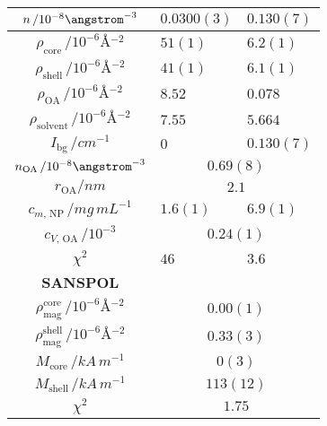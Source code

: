 \documentclass[\main/dresen_thesis.tex]{subfiles}
\begin{document}
\begin{table}[!htbp]
\begin{tabular}{ c | l | l }
        \hline
        \rule{0pt}{2ex} $n \, / 10^{-8} \angstrom^{-3}$                              & $0.0300(3)$     & $0.130(7)$\\
        \hline
        \rule{0pt}{2ex} $\rho_\mathrm{core}    \, / \unit{10^{-6} \angstrom^{-2}}$   & $51(1)$  & $6.2(1)$\\
        \rule{0pt}{2ex} $\rho_\mathrm{shell}   \, / \unit{10^{-6} \angstrom^{-2}}$   & $41(1)$  & $6.1(1)$\\
        \rule{0pt}{2ex} $\rho_\mathrm{OA}      \, / \unit{10^{-6} \angstrom^{-2}}$   & $8.52$   & $0.078$\\
        \rule{0pt}{2ex} $\rho_\mathrm{solvent} \, / \unit{10^{-6} \angstrom^{-2}}$   & $7.55$   & $5.664$\\
        \rule{0pt}{2ex} $I_\mathrm{bg} \, / \unit{cm^{-1}}$                          & $0$      & $0.130(7)$\\
        \hline
        \rule{0pt}{2ex} $n_\mathrm{OA} \, / 10^{-8} \angstrom^{-3}$                  & \multicolumn{2}{c}{$0.69(8)$}\\
        \rule{0pt}{2ex} $r_\mathrm{OA} / \unit{nm}$                                  & \multicolumn{2}{c}{$2.1$}\\
        \hline
        \rule{0pt}{2ex} $c_{m, \, \mathrm{NP}} \, / \unit{mg\, mL^{-1}}$             & $1.6(1)$  & $6.9(1)$\\
        \rule{0pt}{2ex} $c_{V, \, \mathrm{OA}} \, / \unit{10^{-3}}$                  & \multicolumn{2}{c}{$0.24(1)$}\\
        \hline
        \rule{0pt}{2ex} $\chi^2$                                                     & $46$     & $3.6$\\
        \hline
        \textbf{SANSPOL}\\
        \hline
        \rule{0pt}{2ex} $\rho_\mathrm{mag}^\mathrm{core} \, / \unit{10^{-6} \angstrom^{-2}}$ & \multicolumn{2}{c}{$0.00(1)$}\\
        \rule{0pt}{2ex} $\rho_\mathrm{mag}^\mathrm{shell} \, / \unit{10^{-6} \angstrom^{-2}}$& \multicolumn{2}{c}{$0.33(3)$}\\
        \rule{0pt}{2ex} $M_\mathrm{core} \, / \unit{kA \,m^{-1}}$                    & \multicolumn{2}{c}{$0(3)$}\\
        \rule{0pt}{2ex} $M_\mathrm{shell} \, / \unit{kA \,m^{-1}}$                   & \multicolumn{2}{c}{$113(12)$}\\
        \hline
        \rule{0pt}{2ex} $\chi^2$                                                     & \multicolumn{2}{c}{$1.75$}\\
      \end{tabular}
    \end{table}
\end{document}
